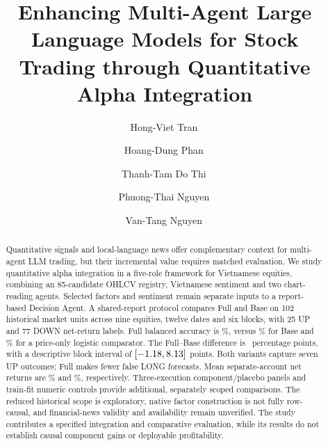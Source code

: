 \documentclass[preprint,12pt]{elsarticle}
\begin{document}
\begin{frontmatter}


\title{Enhancing Multi-Agent Large Language Models for Stock Trading through Quantitative Alpha Integration}

\author[1]{Hong-Viet Tran\,}
\author[1]{Hoang-Dung Phan\,}
\author[1,2]{Thanh-Tam Do Thi\,}
\author[1]{Phuong-Thai Nguyen\,}
\author[3]{Van-Tang Nguyen\,}






\begin{abstract}
Quantitative signals and local-language news offer complementary context for multi-agent LLM trading, but their incremental value requires matched evaluation. We study quantitative alpha integration in a five-role framework for Vietnamese equities, combining an 85-candidate OHLCV registry, Vietnamese sentiment and two chart-reading agents. Selected factors and sentiment remain separate inputs to a report-based Decision Agent. A shared-report protocol compares Full and Base on 102 historical market units across nine equities, twelve dates and six blocks, with 25 UP and 77 DOWN net-return labels. Full balanced accuracy is \FullBA\%, versus \BaseBA\% for Base and \LogisticPriceBA\% for a price-only logistic comparator. The Full--Base difference is \DeltaBA\ percentage points, with a descriptive block interval of $[-1.18,8.13]$ points. Both variants capture seven UP outcomes; Full makes fewer false LONG forecasts. Mean separate-account net returns are \FullReturn\% and \BaseReturn\%, respectively. Three-execution component/placebo panels and train-fit numeric controls provide additional, separately scoped comparisons. The reduced historical scope is exploratory, native factor construction is not fully row-causal, and financial-news validity and availability remain unverified. The study contributes a specified integration and comparative evaluation, while its results do not establish causal component gains or deployable profitability.
\end{abstract}


\end{frontmatter}
\end{document}
